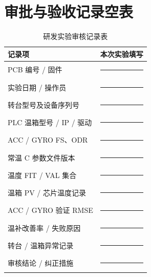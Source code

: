 \section{审批与验收记录空表}
\begin{table}[htbp]\centering\small
\caption{研发实验审核记录表}\label{tab:record}
\begin{tabularx}{\linewidth}{@{}p{48mm}Y@{}}\toprule
记录项 & 本次实验填写\\\midrule
PCB 编号 / 固件 & \rule{65mm}{.3pt}\\[3mm]
实验日期 / 操作员 & \rule{65mm}{.3pt}\\[3mm]
转台型号及设备序列号 & \rule{65mm}{.3pt}\\[3mm]
PLC 温箱型号 / IP / 驱动 & \rule{65mm}{.3pt}\\[3mm]
ACC / GYRO FS、ODR & \rule{65mm}{.3pt}\\[3mm]
常温 C 参数文件版本 & \rule{65mm}{.3pt}\\[3mm]
温度 FIT / VAL 集合 & \rule{65mm}{.3pt}\\[3mm]
温箱 PV / 芯片温度记录 & \rule{65mm}{.3pt}\\[3mm]
ACC / GYRO 验证 RMSE & \rule{65mm}{.3pt}\\[3mm]
温补改善率 / 失败原因 & \rule{65mm}{.3pt}\\[3mm]
转台 / 温箱异常记录 & \rule{65mm}{.3pt}\\[3mm]
审核结论 / 纠正措施 & \rule{65mm}{.3pt}\\[3mm]
\bottomrule\end{tabularx}\end{table}
